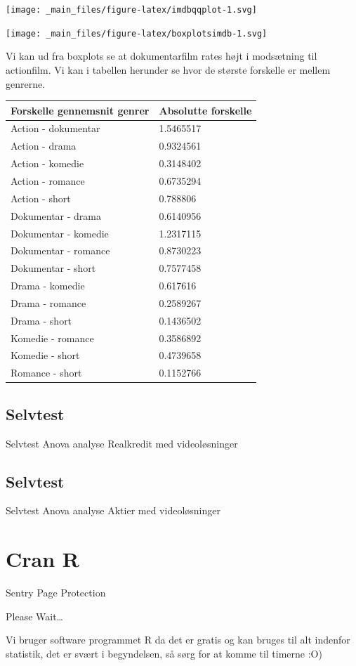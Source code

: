 \documentclass[]{book}
\begin{document}
\texttt{[image: \_main\_files/figure-latex/imdbqqplot-1.svg]}

\texttt{[image: \_main\_files/figure-latex/boxplotsimdb-1.svg]}

Vi kan ud fra boxplots se at dokumentarfilm rates højt i modsætning til actionfilm. Vi kan i tabellen herunder se hvor de største forskelle er mellem genrerne.

\begin{longtable}[]{@{}ll@{}}
\toprule
Forskelle gennemsnit genrer & Absolutte forskelle\tabularnewline
\midrule
\endhead
Action - dokumentar & 1.5465517\tabularnewline
Action - drama & 0.9324561\tabularnewline
Action - komedie & 0.3148402\tabularnewline
Action - romance & 0.6735294\tabularnewline
Action - short & 0.788806\tabularnewline
Dokumentar - drama & 0.6140956\tabularnewline
Dokumentar - komedie & 1.2317115\tabularnewline
Dokumentar - romance & 0.8730223\tabularnewline
Dokumentar - short & 0.7577458\tabularnewline
Drama - komedie & 0.617616\tabularnewline
Drama - romance & 0.2589267\tabularnewline
Drama - short & 0.1436502\tabularnewline
Komedie - romance & 0.3586892\tabularnewline
Komedie - short & 0.4739658\tabularnewline
Romance - short & 0.1152766\tabularnewline
\bottomrule
\end{longtable}

\hypertarget{selvtest-2}{%
\section{Selvtest}\label{selvtest-2}}

Selvtest Anova analyse Realkredit med videoløsninger

\hypertarget{selvtest-3}{%
\section{Selvtest}\label{selvtest-3}}

Selvtest Anova analyse Aktier med videoløsninger

\hypertarget{cran-r}{%
\chapter{Cran R}\label{cran-r}}

\hypertarget{Sentry_noJS}{}
Sentry Page Protection

\hypertarget{Sentry_redirecting}{}
Please Wait\ldots{}

Vi bruger software programmet R da det er gratis og kan bruges til alt indenfor statistik, det er svært i begyndelsen, så sørg for at komme til timerne :O)
\end{document}

